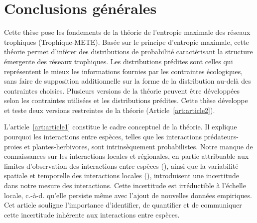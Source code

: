 
\francais   

\chapter{Conclusions générales}


Cette thèse pose les fondements de la théorie de l'entropie maximale des réseaux
trophiques (Trophique-METE). Basée sur le principe d'entropie maximale, cette
théorie permet d'inférer des distributions de probabilité caractérisant la
structure émergente des réseaux trophiques. Les distributions prédites sont
celles qui représentent le mieux les informations fournies par les contraintes
écologiques, sans faire de supposition additionnelle sur la forme de la
distribution au-delà des contraintes choisies. Plusieurs versions de la théorie
peuvent être développées selon les contraintes utilisées et les distributions
prédites. Cette thèse développe et teste deux versions restreintes de la théorie
(Article~\ref{art:article2}). 

L'article~\ref{art:article1} constitue le cadre conceptuel de la théorie. Il
explique pourquoi les interactions entre espèces, telles que les interactions
prédateurs-proies et plantes-herbivores, sont intrinsèquement probabilistes.
Notre manque de connaissances sur les interactions locales et régionales, en
partie attribuable aux limites d'observation des interactions entre espèces
(\cite{Jordano2016Sampling}), ainsi que la variabilité spatiale et temporelle
des interactions locales (\cite{Poisot2015Species}), introduisent une
incertitude dans notre mesure des interactions. Cette incertitude est
irréductible à l'échelle locale, c.-à-d. qu'elle persiste même avec l'ajout de
nouvelles données empiriques. Cet article souligne l'importance d'identifier, de
quantifier et de communiquer cette incertitude inhérente aux interactions entre
espèces. 

